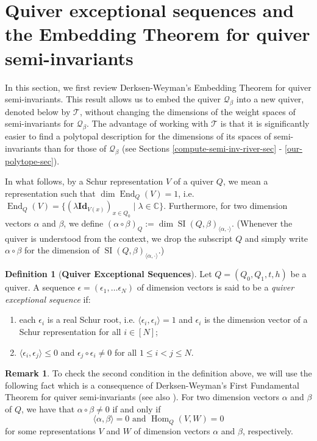 \documentclass[11pt]{article}
\theoremstyle{definition}
\newtheorem{defi}[theo]{Definition}
\newtheorem{remark}[theo]{Remark}
\numberwithin{equation}{section}
\newcommand{\Hom}{\operatorname{Hom}}
\newcommand{\End}{\operatorname{End}}
\newcommand{\SI}{\operatorname{SI}}
\newcommand{\CC}{\mathbb C}
\newcommand{\Q}{\mathbf{\mathcal{Q}}}
\newcommand{\eps}{\epsilon}
\newcommand{\Id}{\mathbf{Id}}
\newcommand{\E}{\epsilon}
\newcommand{\river}{\mathcal{T}}
\begin{document}
\section{Quiver exceptional sequences and the Embedding Theorem for quiver semi-invariants} \label{qes-embedding-sec}
In this section, we first review Derksen-Weyman's  Embedding Theorem for quiver semi-invariants. This result allows us to embed the quiver $\Q_{\beta}$ into a new quiver, denoted below by $\river$, without changing the dimensions of the weight spaces of semi-invariants for $\Q_\beta$. The advantage of working with $\river$ is that it is significantly easier to find a polytopal description for the dimensions of its spaces of semi-invariants than for those of $\Q_\beta$ (see Sections \ref{compute-semi-inv-river-sec} - \ref{our-polytope-sec}).

In what follows, by a Schur representation $V$ of a quiver $Q$, we mean a representation such that $\dim \End_Q(V)=1$, i.e. $\End_Q(V)=\{(\lambda\Id_{V(x)})_{x \in Q_0} \mid \lambda \in \CC \}$. Furthermore, for two dimension vectors $\alpha$ and $\beta$, we define $(\alpha \circ \beta)_Q:=\dim \SI(Q, \beta)_{\langle \alpha, \cdot \rangle}$. (Whenever the quiver is understood from the context, we drop the subscript $Q$ and simply write $\alpha \circ \beta$ for the dimension of $\SI(Q, \beta)_{\langle \alpha, \cdot \rangle}$.) 

\begin{defi}[\textbf{Quiver Exceptional Sequences}] Let $Q=(Q_0, Q_1, t, h)$ be a quiver. A sequence $\E = (\eps_1, \ldots \eps_N)$ of dimension vectors is said to be a \emph{quiver exceptional sequence} if: 
	\begin{enumerate}
		\item each $\eps_i$ is a real Schur root, i.e. $\langle \eps_i, \eps_i \rangle = 1$ and $\eps_i$ is the dimension vector of a Schur representation for all $i \in [N]$;
		
	    \item $\langle \eps_i, \eps_j \rangle \leq 0$ and $\eps_j \circ \eps_i\neq 0$ for all $1 \leq i < j \leq N$. 
	\end{enumerate}
\end{defi} 

\begin{remark} To check the second condition in the definition above, we will use the following fact which is a consequence of Derksen-Weyman's First Fundamental Theorem for quiver semi-invariants \cite{DW1} (see also \cite{CB}). For two dimension vectors $\alpha$ and $\beta$ of $Q$, we have that $\alpha \circ \beta \neq 0$ if and only if
$$
\langle \alpha, \beta \rangle =0 \text{~and~} \Hom_Q(V, W)=0
$$ 
for some representations $V$ and $W$ of dimension vectors $\alpha$ and $\beta$, respectively.
\end{remark}
\end{document}
